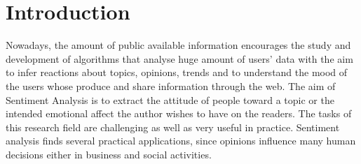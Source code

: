 \chapter{Introduction}

Nowadays, the amount of public available information encourages the study and development of algorithms that analyse huge amount of users' data with the aim to infer reactions about topics, opinions, trends and to understand the mood of the users whose produce and share information through the web. The aim of Sentiment Analysis is to extract the attitude of people toward a topic or the intended emotional affect the author wishes to have on the readers. The tasks of this research field are challenging as well as very useful in practice. Sentiment analysis finds several practical applications, since opinions influence many human decisions either in business and social activities.  

